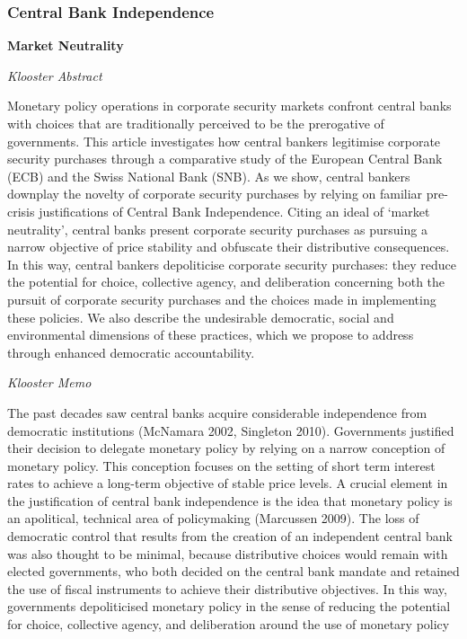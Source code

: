 \documentclass[
]{book}
\begin{document}
\hypertarget{central-bank-independence}{%
\subsubsection{Central Bank Independence}\label{central-bank-independence}}

\textbf{Market Neutrality}

\emph{Klooster Abstract}

Monetary policy operations in corporate security markets confront central
banks with choices that are traditionally perceived to be the prerogative of
governments. This article investigates how central bankers legitimise
corporate security purchases through a comparative study of the
European Central Bank (ECB) and the Swiss National Bank (SNB). As we
show, central bankers downplay the novelty of corporate security
purchases by relying on familiar pre-crisis justifications of Central Bank
Independence. Citing an ideal of `market neutrality', central banks
present corporate security purchases as pursuing a narrow objective of
price stability and obfuscate their distributive consequences. In this way,
central bankers depoliticise corporate security purchases: they reduce
the potential for choice, collective agency, and deliberation concerning
both the pursuit of corporate security purchases and the choices made
in implementing these policies. We also describe the undesirable
democratic, social and environmental dimensions of these practices,
which we propose to address through enhanced democratic
accountability.

\emph{Klooster Memo}

The past decades saw central banks acquire considerable independence from democratic institutions
(McNamara 2002, Singleton 2010). Governments justified their decision to delegate monetary policy
by relying on a narrow conception of monetary policy. This conception focuses on the setting of short
term interest rates to achieve a long-term objective of stable price levels. A crucial element in the
justification of central bank independence is the idea that monetary policy is an apolitical, technical
area of policymaking (Marcussen 2009). The loss of democratic control that results from the creation
of an independent central bank was also thought to be minimal, because distributive choices would
remain with elected governments, who both decided on the central bank mandate and retained the
use of fiscal instruments to achieve their distributive objectives. In this way, governments depoliticised
monetary policy in the sense of reducing the potential for choice, collective agency, and deliberation
around the use of monetary policy
\end{document}
